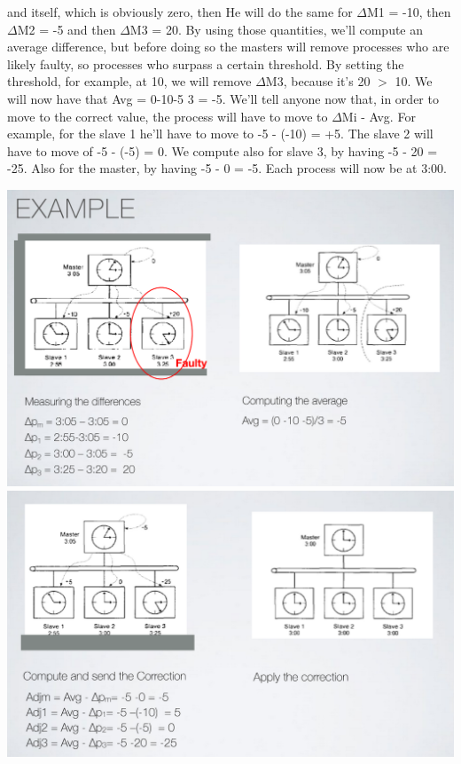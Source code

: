 \documentclass[11pt, a4paper]{article}
\begin{document}
and itself, which is obviously zero, then He will do the same for $\Delta$M1 = -10, then
$\Delta$M2 = -5 and then $\Delta$M3 = 20. By using those quantities, we'll compute an
average difference, but before doing so the masters will remove processes who are
likely faulty, so processes who surpass a certain threshold. By setting the
threshold, for example, at 10, we will remove $\Delta$M3, because it's 20 $>$ 10. We will
now have that Avg = 0-10-5
3 = -5.
We'll tell anyone now that, in order to move to the correct value, the process will
have to move to $\Delta$Mi - Avg. For example, for the slave 1 he'll have to move to
-5 - (-10) = +5. The slave 2 will have to move of -5 - (-5) = 0. We compute
also for slave 3, by having -5 - 20 = -25. Also for the master, by having
-5 - 0 = -5. Each process will now be at 3:00.
\begin{center}
    \includegraphics[scale=0.4]{img/synchro_algs/berk1.png}
    \includegraphics[scale=0.4]{img/synchro_algs/berk2.png}
\end{center}
\end{document}
